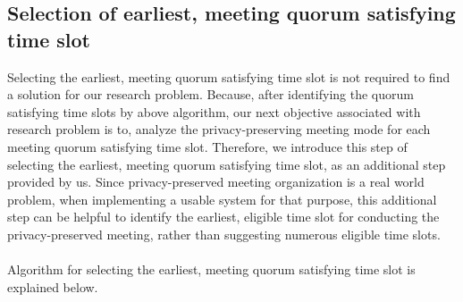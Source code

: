 \subsection{Selection of earliest, meeting quorum satisfying time slot}
Selecting the earliest, meeting quorum satisfying time slot is not required to find a solution for our research problem. Because, after identifying the quorum satisfying time slots by above algorithm, our next objective associated with research problem is to, analyze the privacy-preserving meeting mode for each meeting quorum satisfying time slot. Therefore, we introduce this step of selecting the earliest, meeting quorum satisfying time slot, as an additional step provided by us. Since privacy-preserved meeting organization is a real world problem, when implementing a usable system for that purpose, this additional step can be helpful to identify the earliest, eligible time slot for conducting the privacy-preserved meeting, rather than suggesting numerous eligible time slots.\\ \\
Algorithm for selecting the earliest, meeting quorum satisfying time slot is explained below.\\ \\
